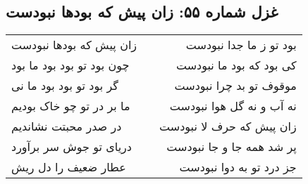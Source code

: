 \begin{center}
\section*{غزل شماره ۵۵: زان پیش که بودها نبودست}
\label{sec:055}
\begin{longtable}{l p{0.5cm} r}
زان پیش که بودها نبودست
&&
بود تو ز ما جدا نبودست
\\
چون بود تو بود بود ما بود
&&
کی بود که بود ما نبودست
\\
گر بود تو بود بود ما نی
&&
موقوف تو بد چرا نبودست
\\
ما بر در تو چو خاک بودیم
&&
نه آب و نه گل هوا نبودست
\\
در صدر محبتت نشاندیم
&&
زان پیش که حرف لا نبودست
\\
دریای تو جوش سر برآورد
&&
پر شد همه جا و جا نبودست
\\
عطار ضعیف را دل ریش
&&
جز درد تو به دوا نبودست
\\
\end{longtable}
\end{center}
